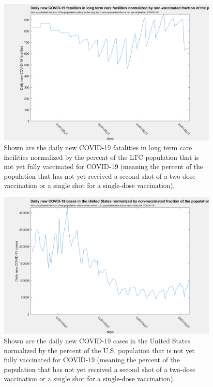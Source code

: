 \documentclass[twoside]{article}
\begin{document}
\begin{multicols}{2}
\begin{figure}[H]
	\includegraphics[width=\linewidth]{images/ltc_normalized_fatalities_vf.png}
	\caption{Shown are the daily new COVID-19 fatalities in long term care facilities normalized by the percent of the LTC population that is not yet fully vaccinated for COVID-19 (meaning the percent of the population that has not yet received a second shot of a two-dose vaccination or a single shot for a single-dose vaccination).}
	\label{fig:images/ltc_normalized_fatalities_vfLabel}
\end{figure}

\begin{figure}[H]
	\includegraphics[width=\linewidth]{images/usa_normalized_cases_vf.png}
	\caption{Shown are the daily new COVID-19 cases in the United States normalized by the percent of the U.S. population that is not yet fully vaccinated for COVID-19 (meaning the percent of the population that has not yet received a second shot of a two-dose vaccination or a single shot for a single-dose vaccination).}
	\label{fig:images/usa_normalized_cases_vfLabel}
\end{figure}


\end{multicols}
\end{document}
